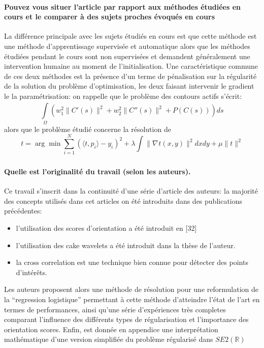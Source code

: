 \documentclass{article}
\begin{document}
\paragraph{Pouvez vous situer l'article par rapport aux méthodes étudiées en cours et le
comparer à des sujets proches évoqués en cours} 
La différence principale avec les sujets étudiés en cours est que cette méthode est une
méthode d'apprentissage supervisée et automatique alors que les méthodes étudiées
pendant le cours sont non supervisées et demandent généralement une intervention humaine
au moment de l'initialisation.\newline
Une caractéristique commune de ces deux méthodes est la présence d'un terme de
pénalisation sur la régularité de la solution du problème d'optimisation, les deux
faisant intervenir le gradient le la paramétrisation: on rappelle que le problème des
contours actifs s'écrit:
\[
    \int\limits_{  \Omega }^{  } \left ( w_1^2 \|C'(s)\|^2 + w_2^2 \|C''(s)\|^2 +
    P(C(s)) \right )ds
\] 
alors que le problème étudié concerne la résolution de 
\[
    t = \arg \min_{  } \sum\limits_{ i=1 }^{ N } \left ( \langle t, p_i \rangle
    - y_i \right )^2 + \lambda \int\limits_{  }^{  } \| \nabla_{  } t(x, y) \|^2 dx dy + \mu \| t \|^2
    \label{eq.2} \tag{2}
\]
\paragraph{Quelle est l'originalité du travail (selon les auteurs).} 
Ce travail s'inscrit dans la continuité d'une  série d'article des auteurs: la majorité
des concepts utilisés dans cet articles on été introduits dans des publications
précédentes:
\begin{itemize}
    \item l'utilisation des scores d'orientation a été introduit en [32]
    \item l'utilisation des cake wavelets a été introduit dans la thèse de l'auteur.
    \item la cross correlation est une technique bien connue pour détecter des points
        d'intérêts.
\end{itemize}
Les auteurs proposent alors une méthode de résolution pour une reformulation de la 
``regression logistique'' permettant à cette méthode d'atteindre l'état de l'art en
termes de performances, ainsi qu'une série d'expériences très completes
comparant l'influence des différents types de régularisation et l'importance des
orientation scores. Enfin, est donnée en appendice une interprétation mathématique d'une
version simplifiée du problème régularisé dans $ SE2(\mathbb{R}) $
\end{document}
